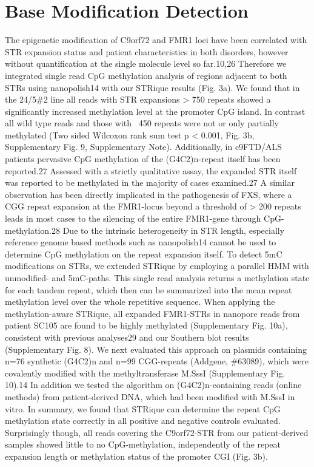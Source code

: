 \section{Base Modification Detection}
\label{sec:strique:modifications}

The epigenetic modification of C9orf72 and FMR1 loci have been correlated with STR expansion status and patient characteristics in both disorders, however without quantification at the single molecule level so far.10,26 Therefore we integrated single read CpG methylation analysis of regions adjacent to both STRs using nanopolish14 with our STRique results (Fig. 3a). We found that in the 24/5\#2 line all reads with STR expansions > 750 repeats showed a significantly increased methylation level at the promoter CpG island. In contrast all wild type reads and those with ~450 repeats were not or only partially methylated (Two sided Wilcoxon rank sum test p < 0.001, Fig. 3b, Supplementary Fig. 9, Supplementary Note).
Additionally, in c9FTD/ALS patients pervasive CpG methylation of the (G4C2)n-repeat itself has been reported.27 Assessed with a strictly qualitative assay, the expanded STR itself was reported to be methylated in the majority of cases examined.27 A similar observation has been directly implicated in the pathogenesis of FXS, where a CGG repeat expansion at the FMR1-locus beyond a threshold of > 200 repeats leads in most cases to the silencing of the entire FMR1-gene through CpG-methylation.28
Due to the intrinsic heterogeneity in STR length, especially reference genome based methods such as nanopolish14 cannot be used to determine CpG methylation on the repeat expansion itself. To detect 5mC modifications on STRs, we extended STRique by employing a parallel HMM with unmodified- and 5mC-paths. This single read analysis returns a methylation state for each tandem repeat, which then can be summarized into the mean repeat methylation level over the whole repetitive sequence.
When applying the methylation-aware STRique, all expanded FMR1-STRs in nanopore reads from patient SC105 are found to be highly methylated (Supplementary Fig. 10a), consistent with previous analyses29 and our Southern blot results (Supplementary Fig. 8). We next evaluated this approach on plasmids containing n=76 synthetic (G4C2)n and n=99 CGG-repeats (Addgene, \#63089), which were covalently modified with the methyltransferase M.SssI (Supplementary Fig. 10).14 In addition we tested the algorithm on (G4C2)n-containing reads (online methods) from patient-derived DNA, which had been modified with M.SssI in vitro. In summary, we found that STRique can determine the repeat CpG methylation state correctly in all positive and negative controls evaluated.
Surprisingly though, all reads covering the C9orf72-STR from our patient-derived samples showed little to no CpG-methylation, independently of the repeat expansion length or methylation status of the promoter CGI (Fig. 3b).


